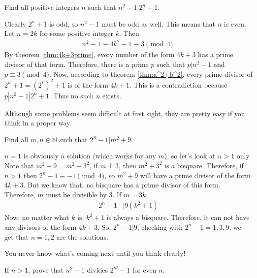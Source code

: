 \documentclass[problems.tex]{subfile}
\begin{document}
	\begin{problem}
		Find all positive integers $n$ such that $n^2-1|2^n+1$.
	\end{problem}
	
	\begin{solution}
		Clearly $2^n+1$ is odd, so $n^2-1$ must be odd as well. This means that $n$ is even. Let $n=2k$ for some positive integer $k$. Then
			\begin{align*}
				n^2-1 \equiv 4k^2 - 1 \equiv 3 \pmod 4.
			\end{align*}
		By theorem \eqref{thm:4k+3prime}, every number of the form $4k+3$ has a prime divisor of that form. Therefore, there is a prime $p$ such that $p|n^2-1$ and $p \equiv 3 \pmod 4$. Now, according to theorem \eqref{thm:a^2+b^2}, every prime divisor of $2^{n}+1=\left(2^{k}\right)^2 + 1$ is of the form $4k+1$. This is a contradiction because $p|n^2-1|2^n+1$. Thus no such $n$ exists.
	\end{solution}
	
	\begin{note}
		Although some problems seem difficult at first sight, they are pretty easy if you think in a proper way. 
	\end{note}
	
	\begin{problem}
		Find all $m,n\in\mathbb{N}$ such that $2^n-1|m^2+9$.
	\end{problem}
	
	\begin{solution}
		$n=1$ is obviously a solution (which works for any $m$), so let's look at $n>1$ only. Note that $m^2+9=m^2+3^2$, if $m\perp3$, then $m^2+3^2$ is a bisquare. Therefore, if $n>1$ then $2^n-1\equiv-1\pmod4$, so $m^2+9$ will have a prime divisor of the form $4k+3$. But we know that, no bisquare has a prime divisor of this form. Therefore, $m$ must be divisible by $3$. If $m=3k$,
		\begin{align*}
		2^n-1 & |9(k^2+1)
		\end{align*}
		Now, no matter what $k$ is, $k^2+1$ is always a bisquare. Therefore, it can not have any divisors of the form $4k+3$. So, $2^n-1|9$, checking with $2^n-1=1,3,9$, we get that $n=1,2$ are the solutions.
	\end{solution}
You never know what's coming next until you think clearly!	
	\begin{problem}
		If $n>1$, prove that $n^2-1$ divides $2^{n!}-1$ for even $n$.
	\end{problem}
	
\end{document}
